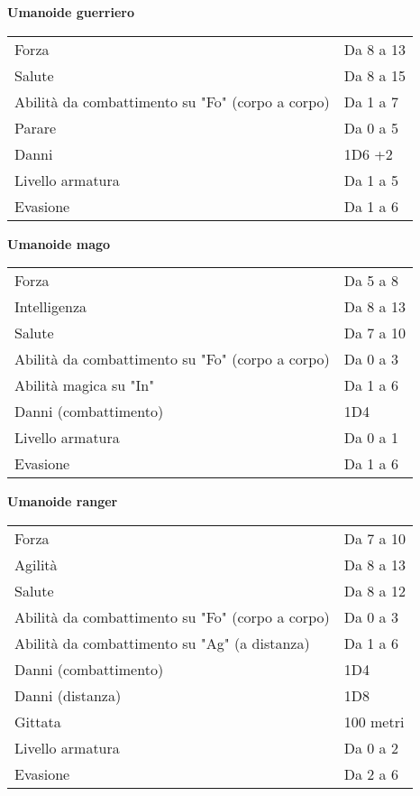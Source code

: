 \documentclass[../manuale_main.tex]{subfiles}
\begin{document}
\begin{center}

\textbf{Umanoide guerriero}\\
\renewcommand{\arraystretch}{1.2}
\begin{tabularx}{\linewidth}{Q F}
Forza&Da 8 a 13\\
Salute&Da 8 a 15\\
Abilità da combattimento su "Fo" (corpo a corpo)&Da 1 a 7\\
Parare&Da 0 a 5\\
Danni&1D6 +2 \\
Livello armatura&Da 1 a 5\\
Evasione&Da 1 a 6\\
\end{tabularx}

\textbf{Umanoide mago}\\
\renewcommand{\arraystretch}{1.2}
\begin{tabularx}{\linewidth}{Q F}
Forza&Da 5 a 8\\
Intelligenza&Da 8 a 13\\
Salute&Da 7 a 10\\
Abilità da combattimento su "Fo" (corpo a corpo)&Da 0 a 3\\
Abilità magica su "In"&Da 1 a 6\\
Danni (combattimento)&1D4\\
Livello armatura&Da 0 a 1\\
Evasione&Da 1 a 6\\
\end{tabularx}


\textbf{Umanoide ranger}\\
\renewcommand{\arraystretch}{1.2}
\begin{tabularx}{\linewidth}{Q F}
Forza&Da 7 a 10\\
Agilità&Da 8 a 13\\
Salute&Da 8 a 12\\
Abilità da combattimento su "Fo" (corpo a corpo)&Da 0 a 3\\
Abilità da combattimento su "Ag" (a distanza)&Da 1 a 6\\
Danni (combattimento)&1D4\\
Danni (distanza)&1D8\\
Gittata&100 metri\\
Livello armatura&Da 0 a 2\\
Evasione&Da 2 a 6\\
\end{tabularx}

\end{center}
\end{document}
